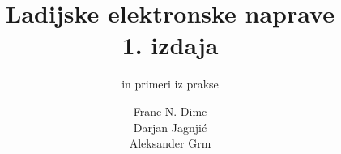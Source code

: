 \documentclass[envcountsame,envcountchap]{svmono}
\begin{document}
\author{Franc N. Dimc\\Darjan Jagnjić\\Aleksander Grm}
\title{Ladijske elektronske naprave\\[2mm]\Large{1. izdaja}}
\subtitle{in primeri iz prakse}
\maketitle

\frontmatter%




\tableofcontents


\mainmatter%


%
%



\backmatter%


\printindex

\end{document}

